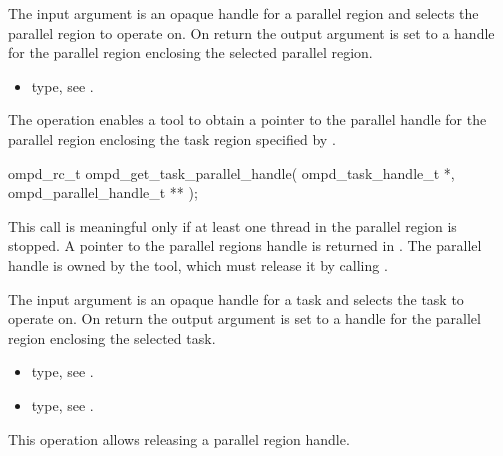 \argdesc
The input argument  is an opaque handle for a parallel region and selects the parallel region to operate on.
On return the output argument  is set to a handle for the parallel region
enclosing the selected parallel region.

\crossreferences
\begin{itemize}
	\item {} type, see .
\end{itemize}

\label{ompd:ompd_get_task_parallel_handle}
\summary
The    operation enables a tool to obtain a 
pointer to the parallel handle for the parallel region enclosing the task region specified by 
.

\format

\begin{cspecific}
\begin{ompSyntax}
ompd_rc_t ompd_get_task_parallel_handle(
  ompd_task_handle_t *,
  ompd_parallel_handle_t **
);
\end{ompSyntax}
\end{cspecific}


\descr
This call is meaningful only if at least one thread in the parallel region is stopped.
A pointer to the parallel regions handle is returned in .
The parallel handle is owned by the 
tool, which must release it by calling .

\argdesc
The input argument  is an opaque handle for a task and selects the task to operate on.
On return the output argument  is set to a handle for the parallel region
enclosing the selected task.

\crossreferences
\begin{itemize}
	\item {} type, see .
	\item {} type, see .
\end{itemize}

\label{ompd:ompd_release_parallel_handle}
\summary
This operation allows releasing a parallel region handle.

